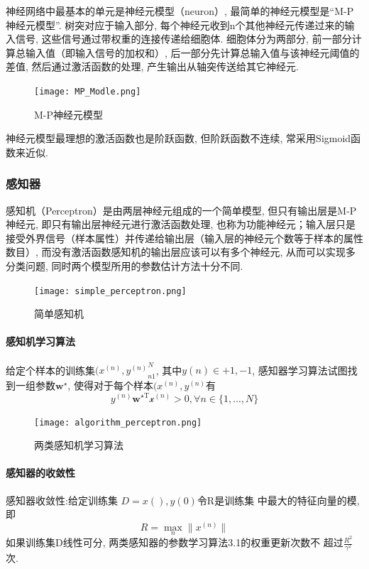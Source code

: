 神经网络中最基本的单元是神经元模型（neuron）, 最简单的神经元模型是“M-P神经元模型”.
树突对应于输入部分, 每个神经元收到n个其他神经元传递过来的输入信号, 这些信号通过带权重的连接传递给细胞体.
细胞体分为两部分, 前一部分计算总输入值（即输入信号的加权和）, 后一部分先计算总输入值与该神经元阈值的差值, 然后通过激活函数的处理, 产生输出从轴突传送给其它神经元.
\begin{figure}
    \centering
    \label{MP_Model}
    \texttt{[image: MP\_Modle.png]}
    \caption{M-P神经元模型}
\end{figure}

神经元模型最理想的激活函数也是阶跃函数, 但阶跃函数不连续, 常采用Sigmoid函数来近似.

\subsubsection{感知器}
感知机（Perceptron）是由两层神经元组成的一个简单模型, 但只有输出层是M-P神经元, 即只有输出层神经元进行激活函数处理, 也称为功能神经元；输入层只是接受外界信号（样本属性）并传递给输出层（输入层的神经元个数等于样本的属性数目）, 而没有激活函数感知机的输出层应该可以有多个神经元, 从而可以实现多分类问题, 同时两个模型所用的参数估计方法十分不同.

\begin{figure}
    \centering
    \label{MP}
    \texttt{[image: simple\_perceptron.png]}
    \caption{简单感知机}
\end{figure}
\newpage
\paragraph{感知机学习算法} 给定个样本的训练集${(x^{(n)}, y^{(n)}}^N_{n1}$, 其中$y(n)\in {+1, -1}$, 感知器学习算法试图找到一组参数$\mathbf{w}^{\star}$, 使得对于每个样本$(x^{(n)}, y^{(n)}$有
\begin{equation}
    y^{(n)} \mathbf{w}^{\star \mathrm{T} }  \mathcal{x}^{(n)}> 0,  \forall n \in \{ 1, ..., N \}
\end{equation}
\begin{figure}
    \centering
    \label{algorithm_perceptron}
    \texttt{[image: algorithm\_perceptron.png]}
    \caption{两类感知机学习算法 }
\end{figure}

\paragraph{感知器的收敛性} 
 感知器收敛性:给定训练集 $D = {x(), y(0)}$令R是训练集
中最大的特征向量的模, 即$$R = \max_n \|x^{(n)}\|$$
如果训练集D线性可分, 两类感知器的参数学习算法3.1的权重更新次数不
超过$\frac{R^2}{\gamma^2}$次.

